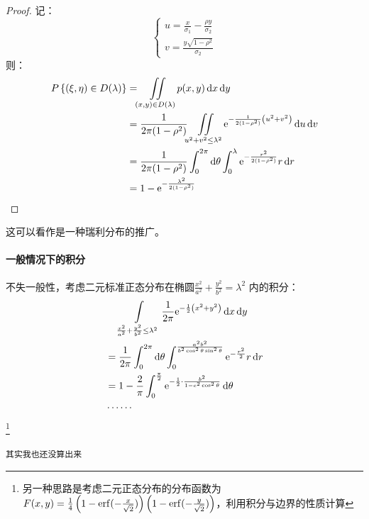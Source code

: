 \begin{proof}
    记：
    \begin{equation}
        \begin{cases}
            u = \frac{x}{\sigma_{1}} - \frac{\rho y}{\sigma_{2}}\\
            v = \frac{y\sqrt{1-\rho^{2}}}{\sigma_{2}}
        \end{cases}
    \end{equation}
    则：
    \begin{align*}
        \P{(\xi,\eta) \in D(\lambda)} &=
        \iint\limits_{(x,y) \in D(\lambda)}
        p(x,y) \d{x} \d{y}\\
        &= \frac{1}{2\pi(1-\rho^{2})} \iint\limits_{u^{2} +
        v^{2} \leq \lambda^{2}}
        \e^{-\frac{1}{2(1-\rho^{2})}\left(u^{2} +
        v^{2}\right)} \d{u} \d{v}\\
        &= \frac{1}{2\pi(1-\rho^{2})} \int_{0}^{2\pi} \d{\theta}
        \int_{0}^{\lambda} \e^{-\frac{r^{2}}{2(1-\rho^{2})}} r \d{r}\\
        &= 1- \e^{-\frac{\lambda^{2}}{2(1-\rho^{2})}}
    \end{align*}
\end{proof}

这可以看作是一种瑞利分布的推广。

\paragraph{一般情况下的积分}
不失一般性，考虑二元标准正态分布在椭圆\(\frac{x^{2}}{a^{2}} +
\frac{y^{2}}{b^{2}} =\lambda^{2}\) 内的积分：
\begin{align*}
    &\placeholder{=} \int\limits_{\frac{x^{2}}{a^{2}} +
        \frac{y^{2}}{b^{2}} \leq
    \lambda^{2}} \frac{1}{2\pi} \e^{-\frac{1}{2}\left(
    x^{2}+y^{2} \right)}  \d{x} \d{y}\\
    &= \frac{1}{2\pi} \int_{0}^{2\pi} \d{\theta}
    \int_{0}^{\frac{a^{2}b^{2}}{b^{2}\cos^{2}\theta
    \sin^{2}\theta}} \e^{-\frac{r^{2}}{2}} r\d{r} \\
    &= 1- \frac{2}{\pi} \int_{0}^{\frac{\pi}{2}}
    \e^{-\frac{1}{2} \cdot
    \frac{b^{2}}{1-e^{2}\cos^{2}\theta}} \d{\theta}\\
    & \cdots \cdots
\end{align*}
\footnote{另一种思路是考虑二元正态分布的分布函数为\(F(x,y) = \frac{1}{4}
        \left(1- \mathrm{erf}(-\frac{x}{\sqrt{2}}) \right)\left( 1-
\mathrm{erf}(-\frac{y}{\sqrt{2}}) \right) \)，利用积分与边界的性质计算}

\texttt{其实我也还没算出来}

